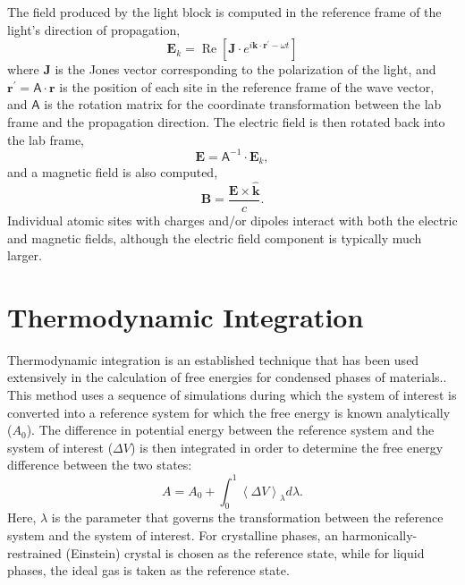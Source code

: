 \documentclass[letterpaper]{report}
\begin{document}
The field produced by the light block is computed in the reference
frame of the light's direction of propagation,
\begin{equation}
\mathbf{E}_k = \operatorname{Re} \left[ \mathbf{J} \cdot  e^{i \mathbf{k}\cdot \mathbf{r}^\prime -
      \omega t} \right]
  \end{equation}
  where $\mathbf{J}$ is the Jones vector corresponding to the
  polarization of the light, and
  $\mathbf{r}^\prime = \mathsf{A}\cdot \mathbf{r}$ is the position of
  each site in the reference frame of the wave vector, and
  $\mathsf{A}$ is the rotation matrix for the coordinate
  transformation between the lab frame and the propagation
  direction. The electric field is then rotated back into the lab frame,
  \begin{equation}
    \mathbf{E} = \mathsf{A}^{-1} \cdot \mathbf{E}_k,\end{equation}
  and a magnetic
  field is also computed,
  \begin{equation}
    \mathbf{B} = \frac{\mathbf{E} \times
      \hat{\mathbf{k}}}{c}.\end{equation}
  Individual atomic sites with charges and/or dipoles
  interact with both the electric and magnetic fields, although the
  electric field component is typically much larger.

\chapter{\label{section:thermInt}Thermodynamic Integration}

Thermodynamic integration is an established technique that has been
used extensively in the calculation of free energies for condensed
phases of
materials.\cite{Frenkel84,Hermens88,Meijer90,Baez95a,Vlot99}.  This
method uses a sequence of simulations during which the system of
interest is converted into a reference system for which the free
energy is known analytically ($A_0$).  The difference in potential
energy between the reference system and the system of interest
($\Delta V$) is then integrated in order to determine the free energy
difference between the two states:
\begin{equation}
 A = A_0 + \int_0^1 \left\langle \Delta V \right\rangle_\lambda
d\lambda.
\label{eq:thermInt}
\end{equation}
Here, $\lambda$ is the parameter that governs the transformation
between the reference system and the system of interest.  For
crystalline phases, an harmonically-restrained (Einstein) crystal is
chosen as the reference state, while for liquid phases, the ideal gas
is taken as the reference state.  
\end{document}
